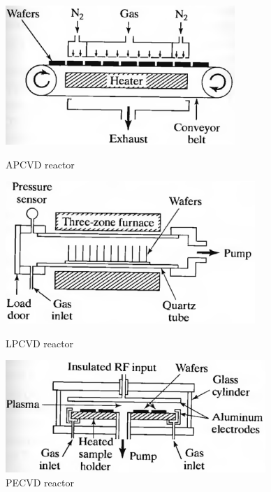 \documentclass[aps,reprint,superscriptaddress,10pt]{revtex4-2}
\begin{document}
  \begin{figure}[htbp]
    \centering
  \includegraphics[scale=0.5]{APCVD.png}
    \caption{APCVD reactor}
    \vspace{0.5cm}
  \includegraphics[scale=0.5]{LPCVD.png}
    \caption{LPCVD reactor}
    \vspace{0.5cm}
    \includegraphics[scale=0.5]{PECVD.png}
    \caption{PECVD reactor}


    \label{fig:CVD}
  \end{figure}
\end{document}
